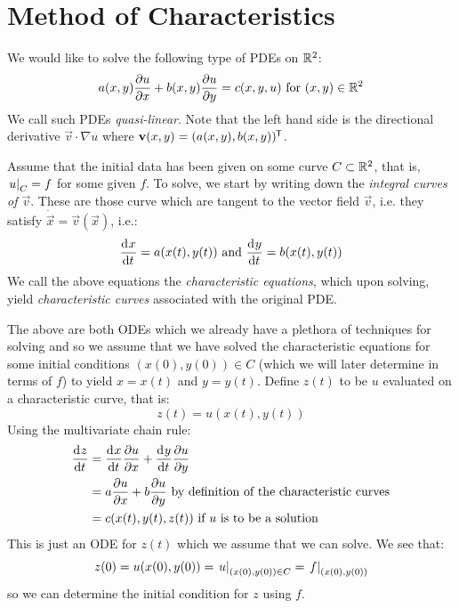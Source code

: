 \documentclass[../main.tex]{subfiles}
\begin{document}
\section{Method of Characteristics}
We would like to solve the following type of PDEs on $\mathbb{R}^2$:
\[
  a(x, y) \pderiv{u}{x} + b(x, y) \pderiv{u}{y} = c(x, y, u) \text{ for } (x, y) \in \R^2
\]
We call such PDEs \textit{quasi-linear}.
Note that the left hand side is the directional derivative $\vec{v} \cdot \nabla u$ where $\mathbf{\bm{v}}(x, y) = (a(x, y), b(x, y))^{{\mkern-1.5mu\mathsf{T}}}$.

Assume that the initial data has been given on some curve $C \subset \mathbb{R}^2$, that is, $\left. u \right|_{C} = f$ for some given $f$.
To solve, we start by writing down the \textit{integral curves of $\vec{v}$}.
These are those curve which  are tangent to the vector field $\vec{v}$, i.e. they satisfy $\dot{\vec{x}} = \vec{v}(\vec{x})$, i.e.:
\[
  \deriv{x}{t} = a(x(t), y(t)) \text{ and } \deriv{y}{t} = b(x(t), y(t))
\]
We call the above equations the \textit{characteristic equations}, which upon solving, yield \textit{characteristic curves} associated with the original PDE.

The above are both ODEs which we already have a plethora of techniques for solving and so we assume that we have solved the characteristic equations for some initial conditions $(x(0), y(0)) \in C$ (which we will later determine in terms of $f$) to yield $x = x(t)$ and $y = y(t)$.
Define $z(t)$ to be $u$ evaluated on a characteristic curve, that is:
\[
  z(t) = u(x(t), y(t))
\]
Using the multivariate chain rule:
\begin{align*}
  \deriv{z}{t} &= \deriv{x}{t} \pderiv{u}{x} + \deriv{y}{t} \pderiv{u}{y} \\
               &= a \pderiv{u}{x} + b \pderiv{u}{y} \text{ by definition of the characteristic curves} \\
               &= c(x(t), y(t), z(t)) \text{ if $u$ is to be a solution}
\end{align*}
This is just an ODE for $z(t)$ which we assume that we can solve.
We see that:
\[
  z(0) = u(x(0), y(0)) = \left. u \right|_{(x(0), y(0)) \in C} = \left. f \right|_{(x(0), y(0))}
\]
so we can determine the initial condition for $z$ using $f$.
\end{document}
